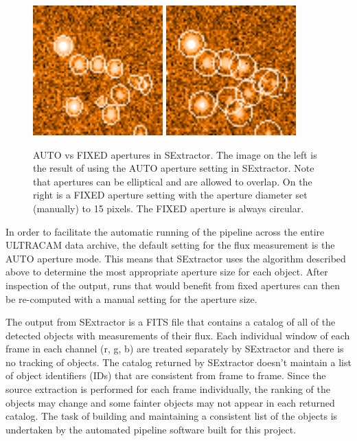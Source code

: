 \begin{figure}
  \centering
  \includegraphics[width=50mm]{images/sex_apertures_auto_cropped.png}
  \includegraphics[width=50mm]{images/sex_apertures_fixed_cropped.png}
  \caption{AUTO vs FIXED apertures in SExtractor. The image on the left is the result of using the AUTO aperture setting in SExtractor. Note that apertures can be elliptical and are allowed to overlap. On the right is a FIXED aperture setting with the aperture diameter set (manually) to 15 pixels. The FIXED aperture is always circular.}
\label{fig:fixedautoapertures}
\end{figure}

In order to facilitate the automatic running of the pipeline across the entire ULTRACAM data archive, the default setting for the flux measurement is the AUTO aperture mode. This means that SExtractor uses the algorithm described above to determine the most appropriate aperture size for each object. After inspection of the output, runs that would benefit from fixed apertures can then be re-computed with a manual setting for the aperture size. 

The output from SExtractor is a FITS file that contains a catalog of all of the detected objects with measurements of their flux. Each individual window of each frame in each channel (r, g, b) are treated separately by SExtractor and there is no tracking of objects. The catalog returned by SExtractor doesn't maintain a list of object identifiers (IDs) that are consistent from frame to frame. Since the source extraction is performed for each frame individually, the ranking of the objects may change and some fainter objects may not appear in each returned catalog. The task of building and maintaining a consistent list of the objects is undertaken by the automated pipeline software built for this project. 


